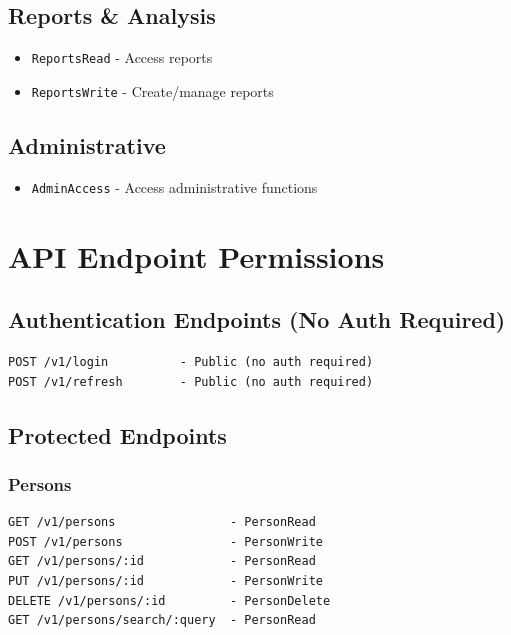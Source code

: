 \subsection{Reports \& Analysis}\label{reports-analysis}

\begin{itemize}
\tightlist
\item
  \texttt{ReportsRead} - Access reports
\item
  \texttt{ReportsWrite} - Create/manage reports
\end{itemize}

\subsection{Administrative}\label{administrative}

\begin{itemize}
\tightlist
\item
  \texttt{AdminAccess} - Access administrative functions
\end{itemize}

\section{API Endpoint Permissions}\label{api-endpoint-permissions}

\subsection{Authentication Endpoints (No Auth
Required)}\label{authentication-endpoints-no-auth-required}

\begin{verbatim}
POST /v1/login          - Public (no auth required)
POST /v1/refresh        - Public (no auth required)
\end{verbatim}

\subsection{Protected Endpoints}\label{protected-endpoints}

\subsubsection{Persons}\label{persons}

\begin{verbatim}
GET /v1/persons                - PersonRead
POST /v1/persons               - PersonWrite
GET /v1/persons/:id            - PersonRead
PUT /v1/persons/:id            - PersonWrite
DELETE /v1/persons/:id         - PersonDelete
GET /v1/persons/search/:query  - PersonRead
\end{verbatim}

